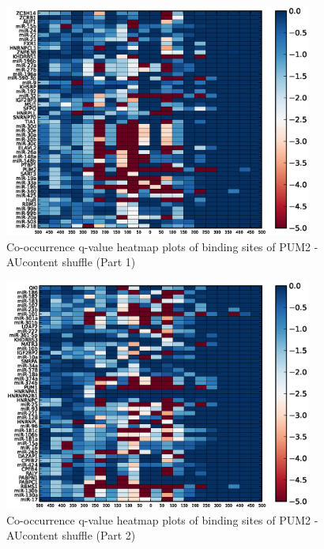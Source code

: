 \begin{figure}
   	\includegraphics[width=0.9\textwidth]{appendix1/figures/PUM2_AUcontent_expressed_heatmap_qvalues0.eps}
   	\caption{Co-occurrence q-value heatmap plots of binding sites of PUM2 - AUcontent shuffle (Part 1)}
\end{figure}
\clearpage
\begin{figure}
   	\includegraphics[width=0.9\textwidth]{appendix1/figures/PUM2_AUcontent_expressed_heatmap_qvalues1.eps}
   	\caption{Co-occurrence q-value heatmap plots of binding sites of PUM2 - AUcontent shuffle (Part 2)}
\end{figure}

